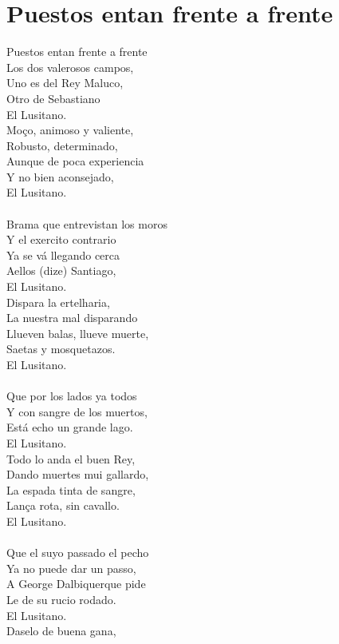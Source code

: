\documentclass{article}
\begin{document}
\section{ Puestos entan frente a frente }
Puestos entan frente a frente\\
Los dos valerosos campos,\\
Uno es del Rey Maluco,\\
Otro de Sebastiano\\
El Lusitano.\\
Moço, animoso y valiente,\\
Robusto, determinado,\\
Aunque de poca experiencia\\
Y no bien aconsejado,\\
El Lusitano.\\
\\
Brama que entrevistan los moros\\
Y el exercito contrario\\
Ya se vá llegando cerca\\
Aellos (dize) Santiago,\\
El Lusitano.\\
Dispara la ertelharia,\\
La nuestra mal disparando\\
Llueven balas, llueve muerte,\\
Saetas y mosquetazos.\\
El Lusitano.\\
\\
Que por los lados ya todos\\
Y con sangre de los muertos,\\
Está echo un grande lago.\\
El Lusitano.\\
Todo lo anda el buen Rey,\\
Dando muertes mui gallardo,\\
La espada tinta de sangre,\\
Lança rota, sin cavallo.\\
El Lusitano.\\
\\
Que el suyo passado el pecho\\
Ya no puede dar un passo,\\
A George Dalbiquerque pide\\
Le de su rucio rodado.\\
El Lusitano.\\
Daselo de buena gana,\\
\end{document}
